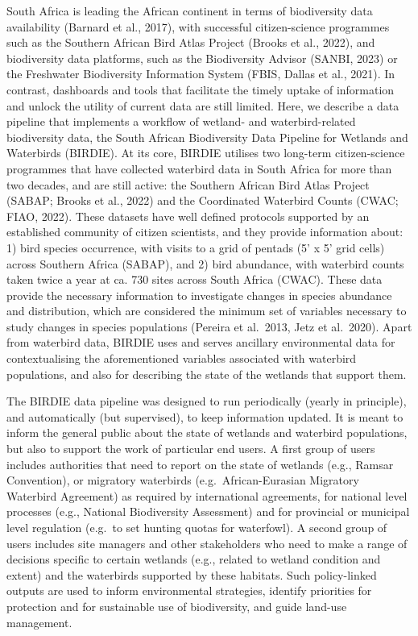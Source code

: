 \documentclass[utf8]{frontiersSCNS}
\begin{document}
South Africa is leading the African continent in terms of biodiversity
data availability (Barnard et al., 2017), with successful
citizen-science programmes such as the Southern African Bird Atlas
Project (Brooks et al., 2022), and biodiversity data platforms, such as
the Biodiversity Advisor (SANBI, 2023) or the Freshwater Biodiversity
Information System (FBIS, Dallas et al., 2021). In contrast, dashboards
and tools that facilitate the timely uptake of information and unlock
the utility of current data are still limited. Here, we describe a data
pipeline that implements a workflow of wetland- and waterbird-related
biodiversity data, the South African Biodiversity Data Pipeline for
Wetlands and Waterbirds (BIRDIE). At its core, BIRDIE utilises two
long-term citizen-science programmes that have collected waterbird data
in South Africa for more than two decades, and are still active: the
Southern African Bird Atlas Project (SABAP; Brooks et al., 2022) and the
Coordinated Waterbird Counts (CWAC; FIAO, 2022). These datasets have
well defined protocols supported by an established community of citizen
scientists, and they provide information about: 1) bird species
occurrence, with visits to a grid of pentads (5' x 5' grid cells) across
Southern Africa (SABAP), and 2) bird abundance, with waterbird counts
taken twice a year at ca. 730 sites across South Africa (CWAC). These
data provide the necessary information to investigate changes in species
abundance and distribution, which are considered the minimum set of
variables necessary to study changes in species populations (Pereira et
al.~2013, Jetz et al.~2020). Apart from waterbird data, BIRDIE uses and
serves ancillary environmental data for contextualising the
aforementioned variables associated with waterbird populations, and also
for describing the state of the wetlands that support them.

The BIRDIE data pipeline was designed to run periodically (yearly in
principle), and automatically (but supervised), to keep information
updated. It is meant to inform the general public about the state of
wetlands and waterbird populations, but also to support the work of
particular end users. A first group of users includes authorities that
need to report on the state of wetlands (e.g., Ramsar Convention), or
migratory waterbirds (e.g.~African-Eurasian Migratory Waterbird
Agreement) as required by international agreements, for national level
processes (e.g., National Biodiversity Assessment) and for provincial or
municipal level regulation (e.g.~to set hunting quotas for waterfowl). A
second group of users includes site managers and other stakeholders who
need to make a range of decisions specific to certain wetlands (e.g.,
related to wetland condition and extent) and the waterbirds supported by
these habitats. Such policy-linked outputs are used to inform
environmental strategies, identify priorities for protection and for
sustainable use of biodiversity, and guide land-use management.
\end{document}
